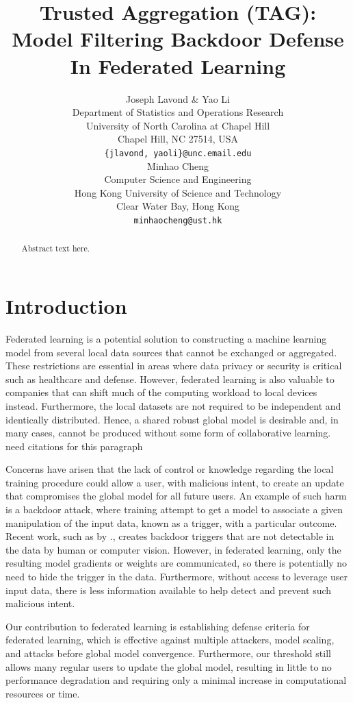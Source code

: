 \documentclass{article} %
\title{
    Trusted Aggregation (TAG): Model Filtering Backdoor Defense In Federated Learning
}
\author{%
    Joseph Lavond \& Yao Li  \\
    Department of Statistics and Operations Research \\
    University of North Carolina at Chapel Hill \\
    Chapel Hill, NC 27514, USA \\
    \texttt{\{jlavond, yaoli\}@unc.email.edu} \\
    \And
    Minhao Cheng \\
    Computer Science and Engineering \\
    Hong Kong University of Science and Technology \\
    Clear Water Bay, Hong Kong \\
    \texttt{minhaocheng@ust.hk}
}
\newcommand{\yli}[1]{{\color{cyan}#1}}
\begin{document}
\maketitle

\begin{abstract}
Abstract text here.
\end{abstract}



\section{Introduction}

Federated learning is a potential solution to constructing a machine learning model from several local data sources that cannot be exchanged or aggregated. These restrictions are essential in areas where data privacy or security is critical such as healthcare and defense. However, federated learning is also valuable to companies that can shift much of the computing workload to local devices instead. Furthermore, the local datasets are not required to be independent and identically distributed. Hence, a shared robust global model is desirable and, in many cases, cannot be produced without some form of collaborative learning. \yli{need citations for this paragraph}


Concerns have arisen that the lack of control or knowledge regarding the local training procedure could allow a user, with malicious intent, to create an update that compromises the global model for all future users. An example of such harm is a backdoor attack, where training attempt to get a model to associate a given manipulation of the input data, known as a trigger, with a particular outcome. Recent work, such as by \cite{stamp-invisible}., creates backdoor triggers that are not detectable in the data by human or computer vision. However, in federated learning, only the resulting model gradients or weights are communicated, so there is potentially no need to hide the trigger in the data. Furthermore, without access to leverage user input data, there is less information available to help detect and prevent such malicious intent. 

Our contribution to federated learning is establishing defense criteria for federated learning, which is effective against multiple attackers, model scaling, and attacks before global model convergence. Furthermore, our threshold still allows many regular users to update the global model, resulting in little to no performance degradation and requiring only a minimal increase in computational resources or time.
\end{document}
